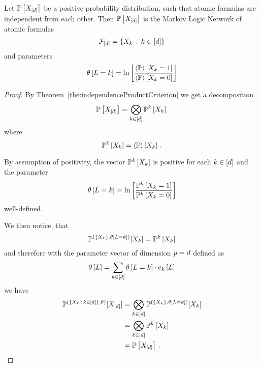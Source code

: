 \begin{theorem}\label{the:independentAtomicMLN}
	Let $\mathbb{P}\left[X_{[d]}\right]$ be a positive probability distribution, such that atomic formulas are independent from each other.
	Then $\mathbb{P}\left[X_{[d]}\right]$ is the Markov Logic Network of atomic formulas
		\[ \mathcal{F}_{[d]} = \{X_{k} \, : \, k\in[d] \} \]
	and parameters
		\[ \theta\left[L=k\right] 
		= \ln \left[ \frac{
		\left\langle \mathbb{P}\right\rangle \left[ X_{k}=1 \right]
		}{
		\left\langle \mathbb{P}\right\rangle \left[ X_{k}=0 \right]
		} \right] \]
\end{theorem}
\begin{proof}
	
	By Theorem~\ref{the:independenceProductCriterion} we get a decomposition 
		\[ \mathbb{P}\left[X_{[d]}\right] = \bigotimes_{k\in[d]} \mathbb{P}^{k}\left[X_{k}\right] \,  \]
	where 
		\[ \mathbb{P}^{k}\left[X_{k}\right] = \left\langle \mathbb{P}\right\rangle \left[ X_{k} \right] \, . \]
	
	By assumption of positivity, the vector $\mathbb{P}^{k}\left[X_{k}\right]$ is positive for each $k\in[d]$ and the parameter
		\[ \theta\left[L=k\right] 
		= \ln \left[ \frac{
		\mathbb{P}^{k}\left[X_{k}=1\right]
		}{
		\mathbb{P}^{k}\left[X_{k}=0\right]
		} \right] \]
	well-defined.
	
	We then notice, that 
		\[ \mathbb{P}^{(\{X_{k}\},\theta\left[L=k\right])}[X_{k}] 
		= \mathbb{P}^{k}\left[X_{k}\right]\]
	and therefore with the parameter vector of dimension $p=d$ defined as
		\[ \theta\left[L\right] = \sum_{k\in[d]} \theta\left[L=k\right] \cdot e_{k}\left[L\right]  \]
	we have
	\begin{align*}
	 	 \mathbb{P}^{(\{X_{k} \, : \, k\in[d]\},\theta)}[X_{[d]}] 
		& = \bigotimes_{k\in[d]} \mathbb{P}^{(\{X_{k}\},\theta\left[L=k\right])}[X_{k}] \\
		& = \bigotimes_{k\in[d]} \mathbb{P}^{k}\left[X_{k}\right] \\
		& = \mathbb{P}\left[X_{[d]}\right] \, . 
	\end{align*}
\end{proof}

